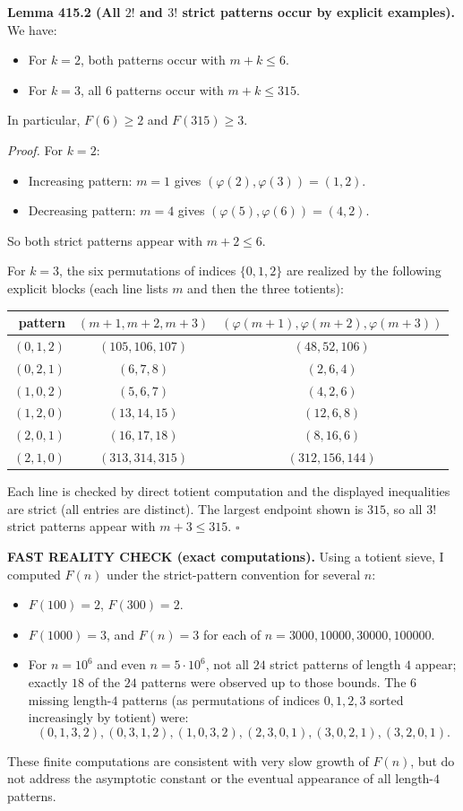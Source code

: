\textbf{Lemma 415.2 (All $2!$ and $3!$ strict patterns occur by explicit examples).}
We have:
\begin{itemize}
  \item For $k=2$, both patterns occur with $m+k\le 6$.
  \item For $k=3$, all $6$ patterns occur with $m+k\le 315$.
\end{itemize}
In particular, $F(6)\ge2$ and $F(315)\ge3$.

\textit{Proof.}
For $k=2$:
\begin{itemize}
  \item Increasing pattern: $m=1$ gives $(\varphi(2),\varphi(3))=(1,2)$.
  \item Decreasing pattern: $m=4$ gives $(\varphi(5),\varphi(6))=(4,2)$.
\end{itemize}
So both strict patterns appear with $m+2\le6$.

For $k=3$, the six permutations of indices $\{0,1,2\}$ are realized by the following explicit blocks (each line lists $m$ and then the three totients):
\begin{center}
\begin{tabular}{r|c|c}
pattern & $(m+1,m+2,m+3)$ & $(\varphi(m+1),\varphi(m+2),\varphi(m+3))$ \\
\hline
$(0,1,2)$ & $(105,106,107)$ & $(48,52,106)$ \\
$(0,2,1)$ & $(6,7,8)$ & $(2,6,4)$ \\
$(1,0,2)$ & $(5,6,7)$ & $(4,2,6)$ \\
$(1,2,0)$ & $(13,14,15)$ & $(12,6,8)$ \\
$(2,0,1)$ & $(16,17,18)$ & $(8,16,6)$ \\
$(2,1,0)$ & $(313,314,315)$ & $(312,156,144)$ \\
\end{tabular}
\end{center}
Each line is checked by direct totient computation and the displayed inequalities are strict (all entries are distinct).
The largest endpoint shown is $315$, so all $3!$ strict patterns appear with $m+3\le315$.
\hfill$\square$

\textbf{FAST REALITY CHECK (exact computations).}
Using a totient sieve, I computed $F(n)$ under the strict-pattern convention for several $n$:
\begin{itemize}
  \item $F(100)=2$, $F(300)=2$.
  \item $F(1000)=3$, and $F(n)=3$ for each of $n=3000,10000,30000,100000$.
  \item For $n=10^6$ and even $n=5\cdot 10^6$, not all $24$ strict patterns of length $4$ appear; exactly $18$ of the $24$ patterns were observed up to those bounds.
  The $6$ missing length-$4$ patterns (as permutations of indices $0,1,2,3$ sorted increasingly by totient) were:
  $$
  (0,1,3,2),(0,3,1,2),(1,0,3,2),(2,3,0,1),(3,0,2,1),(3,2,0,1).
  $$
\end{itemize}
These finite computations are consistent with very slow growth of $F(n)$, but do not address the asymptotic constant or the eventual appearance of all length-$4$ patterns.

